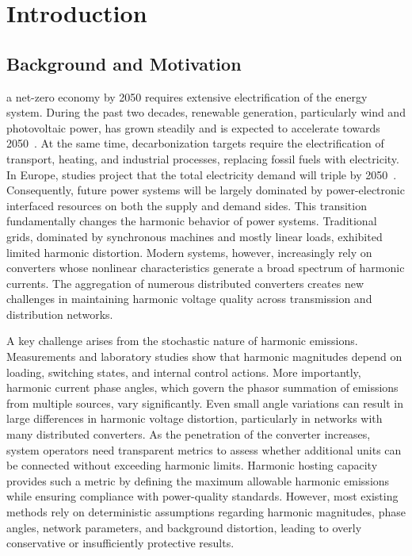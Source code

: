 \section{Introduction}
\label{sec:introduction}

\subsection{Background and Motivation}
\label{sec:background_and_motivation}

 a net-zero economy by 2050 requires extensive electrification of the energy system. During the past two decades, renewable generation, particularly wind and photovoltaic power, has grown steadily and is expected to accelerate towards 2050~\cite{international_energy_agency_world_2023}. At the same time, decarbonization targets require the electrification of transport, heating, and industrial processes, replacing fossil fuels with electricity. In Europe, studies project that the total electricity demand will triple by 2050~\cite{energyville_paths_2023}. Consequently, future power systems will be largely dominated by power-electronic interfaced resources on both the supply and demand sides. This transition fundamentally changes the harmonic behavior of power systems. Traditional grids, dominated by synchronous machines and mostly linear loads, exhibited limited harmonic distortion. Modern systems, however, increasingly rely on converters whose nonlinear characteristics generate a broad spectrum of harmonic currents. The aggregation of numerous distributed converters creates new challenges in maintaining harmonic voltage quality across transmission and distribution networks.

A key challenge arises from the stochastic nature of harmonic emissions. Measurements and laboratory studies show that harmonic magnitudes depend on loading, switching states, and internal control actions. More importantly, harmonic current phase angles, which govern the phasor summation of emissions from multiple sources, vary significantly. Even small angle variations can result in large differences in harmonic voltage distortion, particularly in networks with many distributed converters. As the penetration of the converter increases, system operators need transparent metrics to assess whether additional units can be connected without exceeding harmonic limits. Harmonic hosting capacity provides such a metric by defining the maximum allowable harmonic emissions while ensuring compliance with power-quality standards. However, most existing methods rely on deterministic assumptions regarding harmonic magnitudes, phase angles, network parameters, and background distortion, leading to overly conservative or insufficiently protective results.

